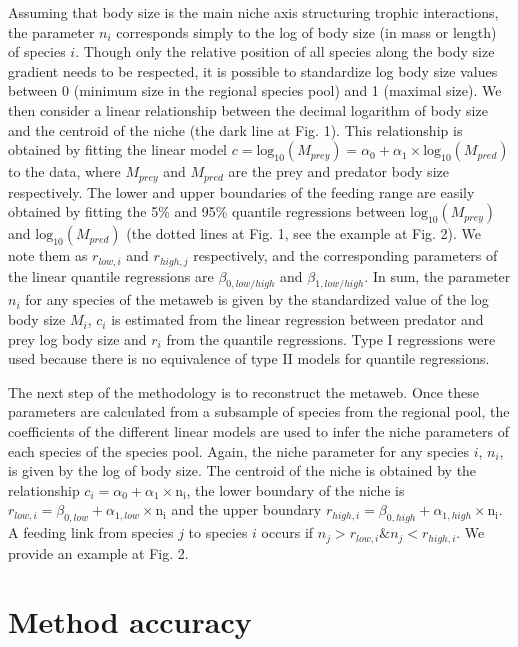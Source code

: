 \documentclass[12pt]{article}
\begin{document}
Assuming that body size is the main niche axis structuring trophic interactions,
the parameter $n_i$ corresponds simply to the log of body size (in mass or
length) of species $i$. Though only the relative position of all species along
the body size gradient needs to be respected, it is possible to standardize log
body size values between 0 (minimum size in the regional species pool) and 1
(maximal size). We then consider a linear relationship between the decimal
logarithm of body size and the centroid of the niche (the dark line at Fig. 1).
This relationship is obtained by fitting the linear model $c =
\mathrm{log}_{10}(M_{prey})=\alpha_0 +
\alpha_1\times\mathrm{log}_{10}(M_{pred})$ to the data, where $M_{prey}$ and
$M_{pred}$ are the prey and predator body size respectively. The lower and upper
boundaries of the feeding range are easily obtained by fitting the 5\% and 95\%
quantile regressions between $\mathrm{log}_{10}(M_{prey})$ and
$\mathrm{log}_{10}(M_{pred})$ (the dotted lines at Fig. 1, see the example at
Fig. 2). We note them as $r_{low,i}$ and $r_{high,j}$ respectively, and the
corresponding parameters of the linear quantile regressions are
$\beta_{0,low/high}$ and $\beta_{1,low/high}$. In sum, the parameter $n_i$ for
any species of the metaweb is given by the standardized value of the log body
size $M_i$, $c_i$ is estimated from the linear regression between predator and
prey log body size and $r_i$ from the quantile regressions. Type I regressions
were used because there is no equivalence of type II models for quantile
regressions.

The next step of the methodology is to reconstruct the metaweb. Once these
parameters are calculated from a subsample of species from the regional pool,
the coefficients of the different linear models are used to infer the niche
parameters of each species of the species pool. Again, the niche parameter for
any species $i$, $n_i$, is given by the log of body size. The centroid of the
niche is obtained by the relationship $c_i = \alpha_0 +
\alpha_1\times\mathrm{n_i}$, the lower boundary of the niche is $r_{low,i} =
\beta_{0,low} + \alpha_{1,low}\times\mathrm{n_i}$ and the upper boundary
$r_{high,i} = \beta_{0,high} + \alpha_{1,high}\times\mathrm{n_i}$. A feeding
link from species $j$ to species $i$ occurs if $n_j > r_{low,i} \& n_j <
r_{high,i}$. We provide an example at Fig. 2.

\section{Method accuracy}
\end{document}
